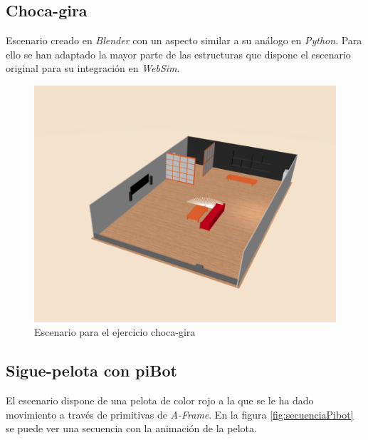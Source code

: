 \subsection{Choca-gira}
Escenario creado en \textit{Blender} con un aspecto similar a su análogo en \textit{Python}. Para ello se han adaptado la mayor parte de las estructuras que dispone el escenario original para su integración en \textit{WebSim}. 

    \begin{figure}[H]
    \centering
    \includegraphics[scale=0.4]{img/bump&go.png}
    \caption{Escenario para el ejercicio choca-gira} \label{fig:chocagira}
    \end{figure}


\subsection{Sigue-pelota con piBot}
El escenario dispone de una pelota de color rojo a la que se le ha dado movimiento a través de primitivas de \textit{A-Frame}. En la figura \ref{fig:secuenciaPibot} se puede ver una secuencia con la animación de la pelota. 

